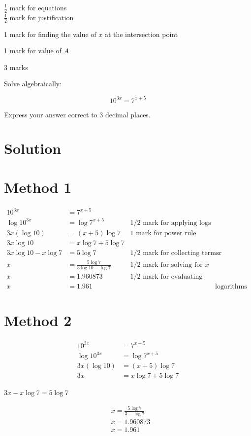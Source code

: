 \documentclass[10pt]{article}
\begin{document}
$\frac{1}{2}$ mark for equations\\
$\frac{1}{2}$ mark for justification

1 mark for finding the value of $x$ at the intersection point

1 mark for value of $A$

3 marks

Solve algebraically:

$$
10^{3 x}=7^{x+5}
$$

Express your answer correct to 3 decimal places.

\section*{Solution}
\section*{Method 1}
$$
\begin{array}{rlrl}
10^{3 x} & =7^{x+5} & \\
\log 10^{3 x} & =\log 7^{x+5} & 1 / 2 \text { mark for applying logs } \\
3 x(\log 10) & =(x+5) \log 7 & 1 \text { mark for power rule } & \\
3 x \log 10 & =x \log 7+5 \log 7 & & \\
3 x \log 10-x \log 7 & =5 \log 7 & 1 / 2 \text { mark for collecting terms with } x & \\
x & =\frac{5 \log 7}{3 \log 10-\log 7} & 1 / 2 \text { mark for solving for } x \\
x & =1.960873 & 1 / 2 \text { mark for evaluating quotient of } \\
x & =1.961 & & \text { logarithms }
\end{array}
$$

\section*{Method 2}
$$
\begin{aligned}
10^{3 x} & =7^{x+5} \\
\log 10^{3 x} & =\log 7^{x+5} \\
3 x(\log 10) & =(x+5) \log 7 \\
3 x & =x \log 7+5 \log 7
\end{aligned}
$$

$3 x-x \log 7=5 \log 7$

$$
\begin{aligned}
& x=\frac{5 \log 7}{3-\log 7} \\
& x=1.960873 \\
& x=1.961
\end{aligned}
$$
\end{document}
